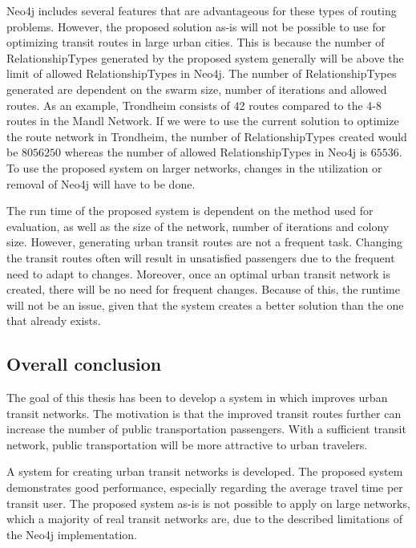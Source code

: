 Neo4j includes several features that are advantageous for these types of routing problems. However, the proposed solution as-is will not be possible to use for optimizing transit routes in large urban cities. This is because the number of RelationshipTypes generated by the proposed system generally will be above the limit of allowed RelationshipTypes in Neo4j. The number of RelationshipTypes generated are dependent on the swarm size, number of iterations and allowed routes. As an example, Trondheim consists of 42 routes compared to the 4-8 routes in the Mandl Network. If we were to use the current solution to optimize the route network in Trondheim, the number of RelationshipTypes created would be $8056250$ whereas the number of allowed RelationshipTypes in Neo4j is $65536$. To use the proposed system on larger networks, changes in the utilization or removal of Neo4j will have to be done. 

The run time of the proposed system is dependent on the method used for evaluation, as well as the size of the network, number of iterations and colony size. However, generating urban transit routes are not a frequent task. Changing the transit routes often will result in unsatisfied passengers due to the frequent need to adapt to changes. Moreover, once an optimal urban transit network is created, there will be no need for frequent changes. Because of this, the runtime will not be an issue, given that the system creates a better solution than the one that already exists. 

\subsection*{Overall conclusion}
The goal of this thesis has been to develop a system in which improves urban transit networks. The motivation is that the improved transit routes further can increase the number of public transportation passengers. With a sufficient transit network, public transportation will be more attractive to urban travelers.

A system for creating urban transit networks is developed. The proposed system demonstrates good performance, especially regarding the average travel time per transit user. The proposed system as-is is not possible to apply on large networks, which a majority of real transit networks are, due to the described limitations of the Neo4j implementation. 
